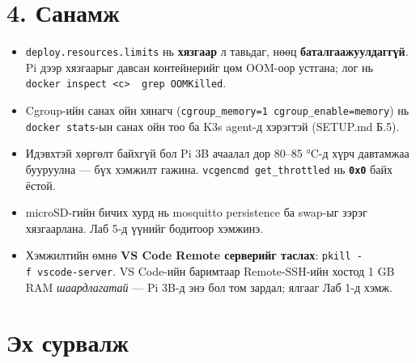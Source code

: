 \hypertarget{ux441ux430ux43dux430ux43cux436}{%
\section{4. Санамж}\label{ux441ux430ux43dux430ux43cux436}}

\begin{itemize}
\tightlist
\item
  \texttt{deploy.\allowbreak{}resources.\allowbreak{}limits} нь \textbf{хязгаар} л тавьдаг, нөөц \textbf{баталгаажуулдаггүй}. Pi дээр хязгаарыг давсан контейнерийг цөм OOM-оор устгана; лог нь \texttt{docker\ inspect\ \textless{}c\textgreater{}\ \textbar{}\ grep\ OOMKilled}.
\item
  Cgroup-ийн санах ойн хянагч (\texttt{cgroup\_\allowbreak{}memory=\allowbreak{}1\ cgroup\_\allowbreak{}enable=\allowbreak{}memory}) нь \texttt{docker\ stats}-ын санах ойн тоо ба K3s agent-д хэрэгтэй (SETUP.md Б.5).
\item
  Идэвхтэй хөргөлт байхгүй бол Pi 3B ачаалал дор 80--85 °C-д хүрч давтамжаа бууруулна --- бүх хэмжилт гажина. \texttt{vcgencmd\ get\_\allowbreak{}throttled} нь \textbf{\texttt{0x0}} байх ёстой.
\item
  microSD-гийн бичих хурд нь mosquitto persistence ба swap-ыг зэрэг хязгаарлана. Лаб 5-д үүнийг бодитоор хэмжинэ.
\item
  Хэмжилтийн өмнө \textbf{VS Code Remote серверийг таслах}: \texttt{pkill\ -f\ vscode-server}. VS Code-ийн баримтаар Remote-SSH-ийн хостод 1 GB RAM \emph{шаардлагатай} --- Pi 3B-д энэ бол том зардал; ялгааг Лаб 1-д хэмж.
\end{itemize}

\hypertarget{ux44dux445-ux441ux443ux440ux432ux430ux43bux436}{%
\section{Эх сурвалж}\label{ux44dux445-ux441ux443ux440ux432ux430ux43bux436}}


